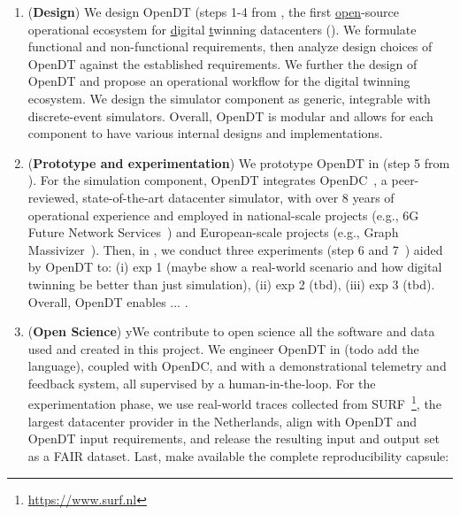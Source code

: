 \begin{enumerate}[label=\textbf{C\arabic*}]
\item \label{introduction:c1} (\textbf{Design}) We design OpenDT (steps 1-4 from \cite{iosup2019atlarge}, the first \underline{open}-source operational ecosystem for \underline{d}igital \underline{t}winning datacenters (). We formulate functional and non-functional requirements, then analyze design choices of OpenDT against the established requirements. We further the design of OpenDT and propose an operational workflow for the digital twinning ecosystem. We design the simulator component as generic, integrable with discrete-event simulators. Overall, OpenDT is modular and allows for each component to have various internal designs and implementations.

\item \label{introduction:c2} (\textbf{Prototype and experimentation}) 
We prototype OpenDT in  (step 5 from \cite{iosup2019atlarge}). For the simulation component, OpenDT integrates OpenDC~\cite{DBLP:conf/ccgrid/MastenbroekAJLB21}, a peer-reviewed, state-of-the-art datacenter simulator, with over 8 years of operational experience and employed in national-scale projects (e.g., 6G Future Network Services~\cite{FutureNetworkServices2025}) and European-scale projects (e.g., Graph Massivizer~\cite{GraphMassivizer2025}). Then, in , we conduct three experiments (step 6 and 7~\cite{iosup2019atlarge}) aided by OpenDT to: (i) exp 1 (maybe show a real-world scenario and how digital twinning be better than just simulation), (ii) exp 2 (tbd), (iii) exp 3 (tbd). Overall, OpenDT enables ... 
.

\item \label{introduction:c3} (\textbf{Open Science}) 
 yWe contribute to open science all the software and data used and created in this project. We engineer OpenDT in (todo add the language), coupled with OpenDC, and with a demonstrational telemetry and feedback system, all supervised by a human-in-the-loop. For the experimentation phase, we use real-world traces collected from SURF~\footnote{\url{https://www.surf.nl}}, the largest datacenter provider in the Netherlands, align with OpenDT and OpenDT input requirements, and release the resulting input and output set as a FAIR dataset. Last, make available the complete reproducibility capsule: 


\end{enumerate}
 



